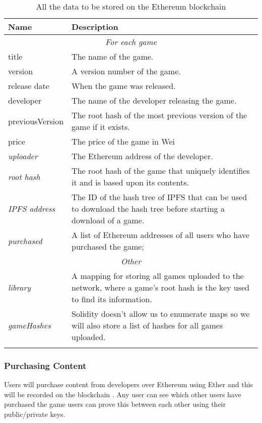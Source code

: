 \begin{longtable}{ p{} p{} }
  \toprule
  \textbf{Name} & \textbf{Description}
  \\\midrule\midrule
  \multicolumn{2}{c}{\cellcolor{red!70}\textit{For each game}} 
  \\\midrule
  title & The name of the game.\\
  version & A version number of the game.\\
  release date & When the game was released.\\
  developer & The name of the developer releasing the game.\\
  previousVersion & The root hash of the most previous version of the game if it exists.\\
  price & The price of the game in Wei\\
  \textit{uploader} & The Ethereum address of the developer.\\
  \textit{root hash} & The root hash of the game that uniquely identifies it and is based upon its contents.\\
  \textit{IPFS address} & The ID of the hash tree of IPFS that can be used to download the hash tree before starting a download of a game.\\
  \textit{purchased} & A list of Ethereum addresses of all users who have purchased the game;\\\midrule
  \multicolumn{2}{c}{\cellcolor{green}\textit{Other}} 
  \\\midrule
  \textit{library} & A mapping for storing all games uploaded to the network, where a game's root hash is the key used to find its information.\\
  \textit{gameHashes} & Solidity doesn't allow us to enumerate maps so we will also store a list of hashes for all games uploaded. 
  \\\bottomrule\bottomrule
  \caption{All the data to be stored on the Ethereum blockchain}
\end{longtable}


\subsubsection*{Purchasing Content}

Users will purchase content from developers over Ethereum using Ether  and this will be recorded on the blockchain . Any user can see which other users have purchased the game users can prove this between each other using their public/private keys.